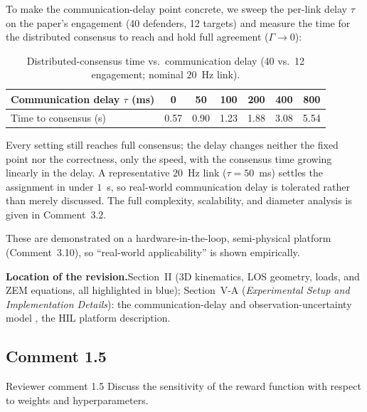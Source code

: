 \documentclass[11pt]{article}
\newcommand{\loc}{\medskip\noindent\textbf{Location of the revision.}\quad}
\begin{document}
To make the communication-delay point concrete, we sweep the per-link delay $\tau$ on the
paper's engagement (40 defenders, 12 targets) and measure the time for the distributed
consensus to reach and hold full agreement ($\Gamma\!\to\!0$):

\begin{table}[h]
\centering
\captionsetup{font=small}
\caption*{\small Distributed-consensus time vs.\ communication delay (40 vs.\ 12
engagement; nominal $20$~Hz link).}
\begin{tabular}{lcccccc}
\toprule
Communication delay $\tau$ (ms) & 0 & 50 & 100 & 200 & 400 & 800 \\
\midrule
Time to consensus (s) & 0.57 & 0.90 & 1.23 & 1.88 & 3.08 & 5.54 \\
\bottomrule
\end{tabular}
\end{table}

\noindent Every setting still reaches full consensus; the delay changes neither the fixed
point nor the correctness, only the speed, with the consensus time growing linearly in the
delay. A representative $20$~Hz link ($\tau=50$~ms) settles the assignment in under $1$~s,
so real-world communication delay is tolerated rather than merely discussed. The full
complexity, scalability, and diameter analysis is given in Comment~3.2.

These are demonstrated on a hardware-in-the-loop, semi-physical platform (Comment~3.10),
so ``real-world applicability'' is shown empirically.

\loc Section~II (3D kinematics, LOS geometry, loads, and ZEM equations, all highlighted
in blue); Section~V-A (\emph{Experimental Setup and Implementation Details}): the
communication-delay and observation-uncertainty model , the HIL
platform description.

\clearpage

\subsection*{Comment 1.5}

\begin{reviewercomment}{Reviewer comment 1.5}
Discuss the sensitivity of the reward function with respect to weights and
hyperparameters.
\end{reviewercomment}
\end{document}

